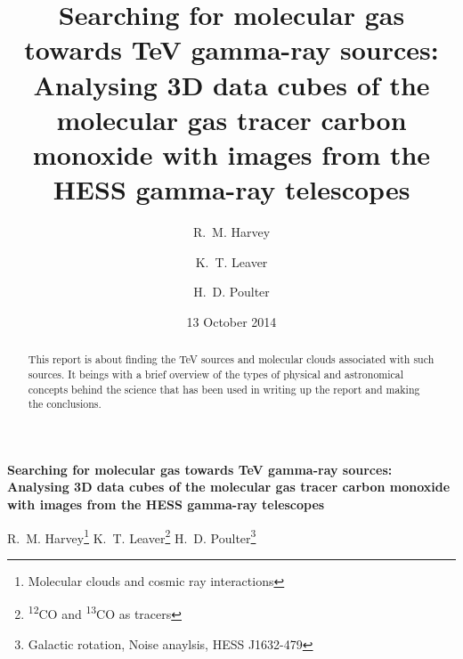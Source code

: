 \documentclass[a4paper, titlepage, oneside]{article}
\newcommand{\elem}[2]{\textsuperscript{#1}{#2}}
\begin{document}
\title{\textbf{Searching for molecular gas towards TeV gamma-ray sources: Analysing 3D data cubes of the molecular gas tracer carbon monoxide with images from the HESS gamma-ray telescopes}}
\author{R.~M. Harvey \and K.~T. Leaver \and H.~D. Poulter}
\date{13 October 2014} %
\maketitle

\setcounter{page}{1}

\tableofcontents

\clearpage
\setcounter{page}{1}

\begin{center}
  {\large \textbf{Searching for molecular gas towards TeV gamma-ray sources: Analysing 3D data cubes of the molecular gas tracer carbon monoxide with images from the HESS gamma-ray telescopes}}

  \vspace{1.5em}

  R.~M. Harvey\footnote{Molecular clouds and cosmic ray interactions} \quad K.~T. Leaver\footnote{\elem{12}{CO} and \elem{13}{CO} as tracers} \quad H.~D. Poulter\footnote{Galactic rotation, Noise anaylsis, HESS J1632-479}
\end{center}

\vspace{1.5em}

\begin{minipage}{0.93\textwidth}
  \begin{abstract}
  This report is about finding the TeV sources and molecular clouds associated with such sources. It beings with a brief overview of the types of physical and astronomical concepts behind the science that has been used in writing up the report and making the conclusions.
  \end{abstract}
\end{minipage}

\vspace{1em}
\end{document}
